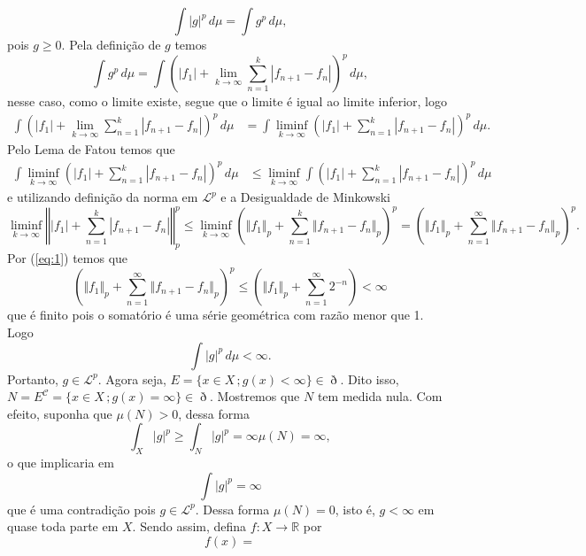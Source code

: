 \documentclass[a4paper, 11pt]{book}
\theoremstyle{definition}
\newcommand{\bR}{\mathbb{R}}
\newcommand{\cC}{\mathcal{C}}
\newcommand{\cL}{\mathcal{L}}
\begin{document}
\begin{prf}
    \[
        \int |g|^p \,d\mu = \int g^p \,d\mu,
    \]
    pois $g \geqslant 0$. Pela definição de $g$ temos
    \[
        \int g^p \,d\mu = \int \left( |f_1| + \lim_{k\to\infty} \sum_{n=1}^{k} |f_{n+1} - f_n| \right)^p \, d\mu,
    \]
    nesse caso, como o limite existe, segue que o limite é igual ao limite inferior, logo
    \[
        \begin{aligned}
            \int \left( |f_1| + \lim_{k\to\infty} \sum_{n=1}^{k} |f_{n+1} - f_n| \right)^p \, d\mu
            &= \int \liminf_{k\to\infty}\left( |f_1| +  \sum_{n=1}^{k} |f_{n+1} - f_n| \right)^p \, d\mu.
        \end{aligned}
    \]
    Pelo Lema de Fatou temos que
    \[
        \begin{aligned}
            \int \liminf_{k\to\infty}\left( |f_1| +  \sum_{n=1}^{k} |f_{n+1} - f_n| \right)^p \, d\mu &\leqslant \liminf_{k\to\infty}\int \left( |f_1| +  \sum_{n=1}^{k} |f_{n+1} - f_n| \right)^p \, d\mu 
        \end{aligned}
    \]
    e utilizando definição da norma em $\cL^p$ e a Desigualdade de Minkowski
    \small{
    \[
        \liminf_{k\to\infty} \left\Vert |f_1| + \sum_{n=1}^k |f_{n+1} - f_n| \right\Vert _p^p  \leqslant \liminf_{k\to\infty} \left( \Vert f_1 \Vert_p + \sum_{n=1}^{k} \Vert f_{n+1} - f_n \Vert_p \right)^p = \left( \Vert f_1 \Vert_p + \sum_{n=1}^{\infty} \Vert f_{n+1} - f_n \Vert_p \right)^p.
    \]}
    Por (\ref{eq:1}) temos que
    \[
        \left( \Vert f_1 \Vert_p + \sum_{n=1}^{\infty} \Vert f_{n+1} - f_n \Vert_p \right)^p \leqslant \left( \Vert f_1 \Vert_p + \sum_{n=1}^{\infty} 2^{-n} \right) < \infty
    \]
    que é finito pois o somatório é uma série geométrica com razão menor que 1.
    Logo
    \[
        \int |g|^p \,d\mu < \infty.
    \]
    Portanto, $g \in \cL^p$.
    Agora seja, $E = \{x \in X \,; g(x) < \infty\} \in \eth$. Dito isso, $N = E^\cC = \{x \in X \,; g(x) = \infty\} \in \eth$. Mostremos que $N$ tem medida nula.
    Com efeito, suponha que $\mu(N) > 0$, dessa forma
    \[
        \int_X |g|^p \geqslant \int_{N} |g|^p  = \infty \mu(N) = \infty,
    \]
    o que implicaria em
    \[
        \int |g|^p = \infty
    \]
    que é uma contradição pois $g \in \cL^p$.
    Dessa forma $\mu(N) = 0$, isto é, $g < \infty$ em quase toda parte em $X$.
    Sendo assim, defina $f : X \to \bR$ por
    \[
        f(x) = 
\]
\end{prf}
\end{document}
